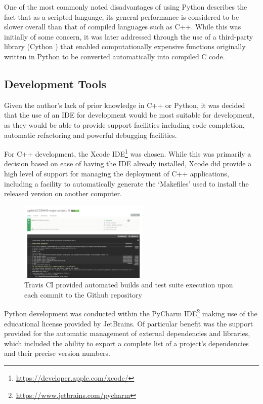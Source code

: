 One of the most commonly noted disadvantages of using Python describes the fact that as a scripted language, its general performance is considered to be slower overall than that of compiled languages such as C++. While this was initially of some concern, it was later addressed through the use of a third-party library (Cython \cite{cython}) that enabled computationally expensive functions originally written in Python to be converted automatically into compiled C code.

\subsection{Development Tools}
\label{develtools}

Given the author's lack of prior knowledge in C++ or Python, it was decided that the use of an IDE for development would be most suitable for development, as they would be able to provide support facilities including code completion, automatic refactoring and powerful debugging facilities. 

For C++ development, the Xcode IDE\footnote{\url{https://developer.apple.com/xcode/}} was chosen. While this was primarily a decision based on ease of having the IDE already installed, Xcode did provide a high level of support for managing the deployment of C++ applications, including a facility to automatically generate the `Makefiles' used to install the released version on another computer. 

\begin{figure}
	\vspace{-10pt}
  \begin{center}
    \includegraphics[width=0.55\textwidth]{images/travisci.png}
  \end{center}
  \vspace{-10pt}
  \caption{Travis CI provided automated builds and test suite execution upon each commit to the Github repository}
  \label{fig:target}
\end{figure}

Python development was conducted within the PyCharm IDE\footnote{\url{https://www.jetbrains.com/pycharm}} making use of the educational license provided by JetBrains. Of particular benefit was the support provided for the automatic management of external dependencies and libraries, which included the ability to export a complete list of a project's dependencies and their precise version numbers.

